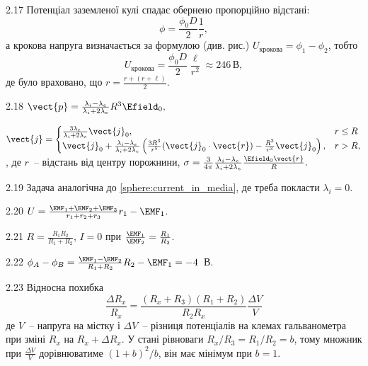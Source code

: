 \begin{Solution}{2.{17}}
Потенціал заземленої кулі спадає обернено пропорційно відстані:
\[
	\phi = \frac{\phi_0 D}{2}\frac{1}{r},
\]
а крокова напруга визначається за формулою (див. рис.) $U_\text{крокова} = \phi_1 - \phi_2$, тобто
\[
	U_\text{крокова} = \frac{\phi_0D}{2}\frac{\ell}{r^2} \approx 246\, \text{В},
\]
де було враховано, що $r = \frac{r + (r + \ell)}{2}$.
\end{Solution}
\begin{Solution}{2.{18}}
	$\vect{p} = \frac{\lambda_i - \lambda_e}{\lambda_i + 2\lambda_e}R^3\Efield_0,$

	$\vect{j} =
		\begin{cases}
			\frac{3\lambda_e}{\lambda_i + 2\lambda_e} \vect{j}_0,                                                                                                    & r \le R \\
			\vect{j}_0  + \frac{\lambda_i - \lambda_e}{\lambda_i + 2\lambda_e} \left( \frac{3R^3}{r^5}(\vect{j}_0\cdot\vect{r}) - \frac{R^3}{r^3}\vect{j}_0\right) , & r > R,
		\end{cases}
	$, де $r$~-- відстань від центру порожнини, $\sigma = \frac{3}{4\pi} \frac{\lambda_i - \lambda_e}{\lambda_i + 2\lambda_e} \frac{\Efield_0\vect{r}}{R}.$
\end{Solution}
\begin{Solution}{2.{19}}
	Задача аналогічна до \ref{sphere:current_in_media}, де треба покласти $\lambda_i = 0$.
\end{Solution}
\begin{Solution}{2.{20}}
	$U = \frac{\EMF_1+\EMF_2+\EMF_3}{r_1 + r_2 + r_3} r_1 - \EMF_1$.
\end{Solution}
\begin{Solution}{2.{21}}
	$R = \frac{R_1R_2}{R_1 + R_2}$, $I = 0$ при $\frac{\EMF_1}{\EMF_2} = \frac{R_1}{R_2}$.
\end{Solution}
\begin{Solution}{2.{22}}
	$\phi_A - \phi_B = \frac{\EMF_1 - \EMF_2}{R_1 + R_2} R_2 - \EMF_1 =-4$~В.
\end{Solution}
\begin{Solution}{2.{23}}
	Відносна похибка
	\[
		\frac{\Delta R_x}{R_x} = \frac{(R_x + R_3)(R_1 + R_2)}{R_2 R_x}\frac{\Delta V}{V}
	\]
	де $V$~-- напруга на містку і $\Delta V$~-- різниця потенціалів на клемах гальванометра при зміні $R_x$ на $R_x + \Delta R_x$. У стані рівноваги $R_x / R_3 = R_1 / R_2 = b$, тому множник при $\frac{\Delta V}{V}$ дорівнюватиме $(1+b)^2/b$, він має мінімум при $b = 1$.
\end{Solution}
